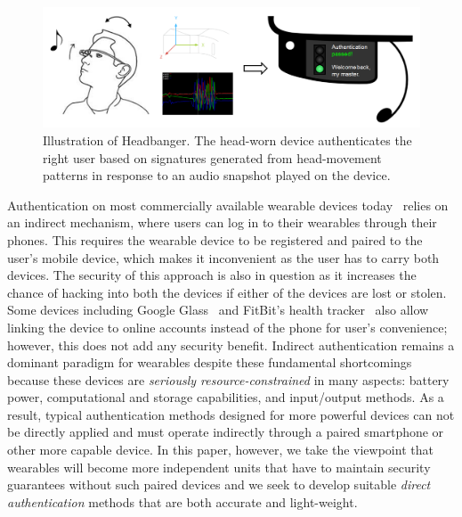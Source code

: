 \begin{figure}
\centering
\includegraphics[width=\columnwidth]{../fig/headbanger-illustrate.png}
\caption{Illustration of Headbanger. The head-worn device authenticates the
right user based on signatures generated from head-movement patterns in
response to an audio snapshot played on the device.}
\label{fig:headbanger-illustrate}
\end{figure}

\vspace{1mm}
Authentication on most commercially available wearable devices today~\cite{fitbit, smartwatch} relies on an indirect mechanism, where users can log in to their wearables through their phones. This requires the wearable device to be registered and paired to the user's mobile device, which makes it inconvenient as the user has to carry both devices. The security of this approach is also in question as it increases the chance of hacking into both the devices if either of the devices are lost or stolen. Some devices including Google Glass~\cite{googleglass} and FitBit's health tracker~\cite{fitbit} also allow linking the device to online accounts instead of the phone for user's convenience; however, this does not add any security benefit. Indirect authentication remains a dominant paradigm for wearables despite these fundamental shortcomings because these devices are \emph{seriously resource-constrained} in many aspects: battery power, computational and storage capabilities, and input/output methods. As a result, typical authentication methods designed for more powerful devices can not be directly applied and must operate indirectly through a paired smartphone or other more capable device. In this paper, however, we take the viewpoint that wearables will become more independent units that have to maintain security guarantees without such paired devices and we seek to develop suitable \emph{direct authentication} methods that are both accurate and light-weight.

